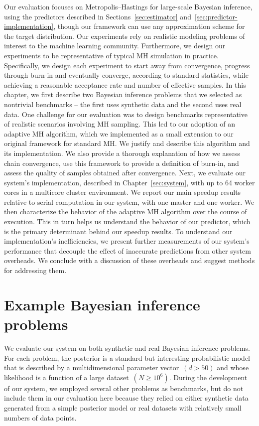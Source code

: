 \documentclass[angelino.tex]{subfiles}
\begin{document}
Our evaluation focuses on Metropolis--Hastings for large-scale Bayesian
inference, using the predictors described in Sections~\ref{sec:estimator} 
and~\ref{sec:predictor-implementation}, though our framework can use any approximation scheme for the target distribution.
%
Our experiments rely on realistic modeling problems of interest to
the machine learning community.
Furthermore, we design our experiments to be representative of typical MH
simulation in practice.
Specifically, we design each experiment to start away from convergence,
progress through burn-in and eventually converge, according to standard statistics,
while achieving a reasonable acceptance rate and number of effective samples.
%
In this chapter, we first describe two Bayesian inference problems that
we selected as nontrivial benchmarks -- the first uses synthetic data and
the second uses real data.
%
One challenge for our evaluation was to design benchmarks representative of
realistic scenarios involving MH sampling.
This led to our adoption of an adaptive MH algorithm, which we implemented
as a small extension to our original framework for standard MH.
We justify and describe this algorithm and its implementation.
%
We also provide a thorough explanation of how we assess chain convergence,
use this framework to provide a definition of burn-in,
and assess the quality of samples obtained after convergence.
%
Next, we evaluate our system's implementation, described in Chapter~\ref{sec:system},
with up to 64 worker cores in a multicore cluster environment.
%
We report our main speedup results relative to serial computation in our system,
\ie with one master and one worker.
%
We then characterize the behavior of the adaptive MH algorithm over the course of execution.
%
This in turn helps us understand the behavior of our predictor,
which is the primary determinant behind our speedup results.
%
To understand our implementation's inefficiencies, we present further
measurements of our system's performance that decouple the effect of inaccurate
predictions from other system overheads.
%
We conclude with a discussion of these overheads and suggest methods for addressing them.


\section{Example Bayesian inference problems}
\label{sec:problems}

We evaluate our system on both synthetic and real Bayesian inference problems.
For each problem, the posterior is a standard but interesting probabilistic model
that is described by a multidimensional parameter vector~$(d > 50)$
and whose likelihood is a function of a large dataset~${(N \ge 10^6)}$.
During the development of our system, we employed several other problems as
benchmarks, but do not include them in our evaluation here because they
relied on either synthetic data generated from a simple posterior model
or real datasets with relatively small numbers of data points.
\end{document}
